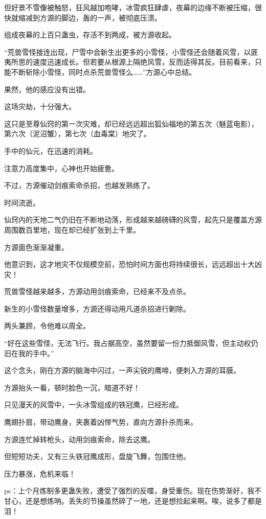 \begin{this_body}
但好景不雪像被触怒，狂风越加咆哮，冰雪疯狂肆虐，夜幕的边缘不断被压缩，很快就缩减到方源的脚边，轰的一声，被彻底压溃。

组成夜幕的上百只蛊虫，存活不到两成，被方源收起。

“荒兽雪怪接连出现，尸雪中会新生出更多的小雪怪，小雪怪还会随着风雪，以匪夷所思的速度迅速成长。但若要从根源上隔绝风雪，反而适得其反。目前看来，只能不断斩除小雪怪，同时点杀荒兽雪怪么……”方源心中总结。

果然，他的感应没有出错。

这场灾劫，十分强大。

这只是至尊仙窍的第一次灾难，却已经远远超出狐仙福地的第五次（魅蓝电影），第六次（泥沼蟹），第七次（血毒棠）地灾了。

手中的仙元，在迅速的消耗。

注意力高度集中，心神也开始疲惫。

不过，方源催动剑痕索命杀招，也越发熟练了。

时间流逝。

仙窍内的天地二气仍旧在不断地动荡，形成越来越磅礴的风雪，起先只是覆盖方源周围数百里地，现在却已经扩张到上千里。

方源面色渐渐凝重。

他意识到，这才地灾不仅规模空前，恐怕时间方面也将持续很长，远远超出十大凶灾！

荒兽雪怪越来越多，方源动用剑痕索命，已经来不及点杀。

新生的小雪怪数量增多，方源还得动用凡道杀招进行剿除。

两头兼顾，令他难以周全。

“好在这些雪怪，无法飞行。我占据高空，虽然要留一份力抵御风雪，但主动权仍旧在我的手中。”

这个念头，刚在方源的脑海中闪过，一声尖锐的鹰啼，便刺入方源的耳膜。

方源抬头一看，顿时脸色一沉，暗道不好！

只见漫天的风雪中，一头冰雪组成的铁冠鹰，已经形成。

鹰翅扑扇，带动鹰身，夹裹着凶悍气势，直向方源扑杀而来。

方源连忙掉转枪头，动用剑痕索命，除去这鹰。

但短短功夫，又有三头铁冠鹰成形，盘旋飞舞，包围住他。

压力暴涨，危机来临！

ps：上个月炼制多更蛊失败，遭受了强烈的反噬，身受重伤。现在伤势渐好，我不甘心，还是想炼呐。丢失的节操虽然碎了一地，还是想捡起来啊。唉，说多了都是泪！

\end{this_body}

